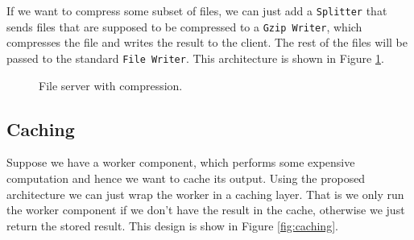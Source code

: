 \documentclass[12pt,a4paper]{article}
\begin{document}
If we want to compress some subset of files, we can just add a \texttt{Splitter}
that sends files that are supposed to be compressed to a \texttt{Gzip Writer}, which
compresses the file and writes the result to the client. The rest of the files
will be passed to the standard \texttt{File Writer}. This architecture is shown in
Figure \ref{fig:fileServer2}.

\begin{figure}[h]
\centering
{}
\caption[scale=1.0]{File server with compression.}
\label{fig:fileServer2}
\end{figure}

\subsection{Caching}
Suppose we have a worker component, which performs some expensive computation
and hence we want to cache its output.
Using the proposed architecture we can just wrap the worker in a caching layer.
That is we only run the worker component if we don't have the result
in the cache, otherwise we just return the stored result. 
This design is show in Figure \ref{fig:caching}.
\end{document}
